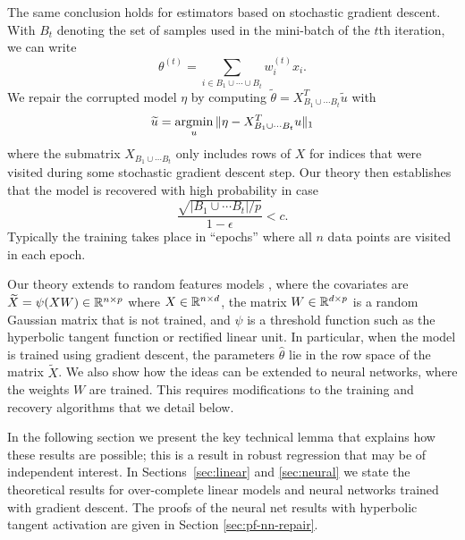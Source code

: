 The same conclusion holds for estimators based on stochastic gradient descent. With $B_t$ denoting the set of samples used in the mini-batch of the $t$th iteration, we can write
\begin{equation}
  \theta^{(t)} = \sum_{i\in B_1\cup\cdots\cup B_t} w_i^{(t)} x_i.
\end{equation}
We repair the corrupted model $\eta$ by computing $\tilde \theta = X^T_{B_1\cup \cdots B_t} \tilde u$ with
\begin{equation}
  \tilde u = \argmin_u \| \eta - X^T_{B_1\cup \cdots B_t} u\|_1
\end{equation}
where the submatrix $X_{B_1\cup\cdots B_t}$ only includes rows of $X$ for indices that were visited during some stochastic
gradient descent step. Our theory then establishes that the model is recovered with high probability in case
\begin{equation}
  \frac{\sqrt{{|B_1 \cup \cdots B_t|}/{p}}}{1-\epsilon} < c.
\end{equation}
Typically the training takes place in ``epochs'' where all $n$ data points are visited in each epoch.

 Our theory extends to random features models \citep{rahimi2008}, where the covariates are $\widetilde X = \psi(X W)\in \mathbb{R}^{n\times p}$ where $X\in\mathbb{R}^{n\times d}$, the matrix $W\in\mathbb{R}^{d\times p}$ is a random Gaussian matrix that is not trained, and $\psi$ is a threshold function such as the hyperbolic tangent function or rectified linear unit. In particular, when the model is trained using gradient descent, the parameters $\hat\theta$ lie in the row
space of the matrix $\tilde X$. We also show how the ideas can be extended to neural networks, where the weights $W$ are trained. This requires modifications to the training and recovery algorithms that we detail below.

In the following section we present the key technical lemma that explains how these results are possible; this is a result in robust regression that may be of independent interest. In Sections~\ref{sec:linear} and \ref{sec:neural} we state the theoretical results for over-complete linear models and neural networks trained with gradient descent. The proofs of the neural net results with hyperbolic tangent activation are given in Section \ref{sec:pf-nn-repair}.
